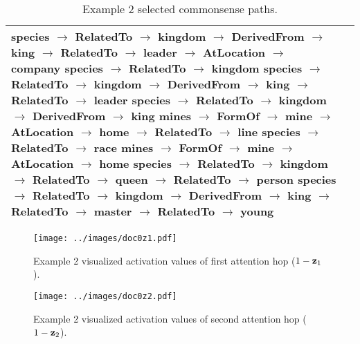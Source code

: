 \documentclass[11pt,a4paper]{article}
\begin{document}
\begin{table*}[ht]
\begin{small}
\begin{tabular}{|p{}|p{}|}
{species $\rightarrow$ RelatedTo $\rightarrow$ kingdom $\rightarrow$ DerivedFrom $\rightarrow$ king $\rightarrow$ RelatedTo $\rightarrow$ leader $\rightarrow$ AtLocation \\ $\rightarrow$ company\\
species $\rightarrow$ RelatedTo $\rightarrow$ kingdom\\
species $\rightarrow$ RelatedTo $\rightarrow$ kingdom $\rightarrow$ DerivedFrom $\rightarrow$ king $\rightarrow$ RelatedTo $\rightarrow$ leader\\
species $\rightarrow$ RelatedTo $\rightarrow$ kingdom $\rightarrow$ DerivedFrom $\rightarrow$ king\\
mines $\rightarrow$ FormOf $\rightarrow$ mine $\rightarrow$ AtLocation $\rightarrow$ home $\rightarrow$ RelatedTo $\rightarrow$ line\\
\textbf{species $\rightarrow$ RelatedTo $\rightarrow$ race}\\
mines $\rightarrow$ FormOf $\rightarrow$ mine $\rightarrow$ AtLocation $\rightarrow$ home\\
species $\rightarrow$ RelatedTo $\rightarrow$ kingdom $\rightarrow$ RelatedTo $\rightarrow$ queen $\rightarrow$ RelatedTo $\rightarrow$ person\\
species $\rightarrow$ RelatedTo $\rightarrow$ kingdom $\rightarrow$ DerivedFrom $\rightarrow$ king $\rightarrow$ RelatedTo $\rightarrow$ master $\rightarrow$ RelatedTo \\ $\rightarrow$ young}\\
\hline
  \end{tabular}
 \caption{Example 2 selected commonsense paths.}
 \label{tab:extractedex2}
 \end{small}
\end{table*}
\begin{figure*}[h]
  \centering
  \texttt{[image: ../images/doc0z1.pdf]}
 \caption{Example 2 visualized activation values of first attention hop ($1 - {\bf z}_1$).}
\end{figure*}
\begin{figure*}[h]
  \centering
  \texttt{[image: ../images/doc0z2.pdf]}
 \caption{Example 2 visualized activation values of second attention hop ($1 - {\bf z}_2$).}

\end{figure*}
\end{document}
